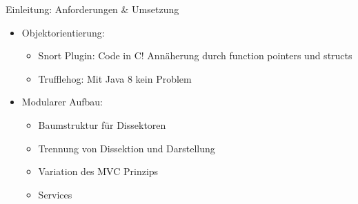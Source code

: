 \begin{frame}{Einleitung: Anforderungen \& Umsetzung}
    \begin{itemize}
        \item Objektorientierung:
        \begin{itemize}
            \item Snort Plugin: Code in C! Annäherung durch function pointers und structs
            \item Trufflehog: Mit Java 8 kein Problem
        \end{itemize}

        \pause
        \item Modularer Aufbau:
        \begin{itemize}
            \item Baumstruktur für Dissektoren
            \item Trennung von Dissektion und Darstellung
            \pause
            \item Variation des MVC Prinzips
            \item Services
        \end{itemize}
    \end{itemize}
\end{frame} 